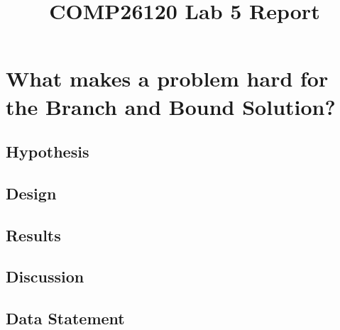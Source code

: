 \documentclass[a4]{article}
\title{COMP26120 Lab 5 Report}
\author{}
\begin{document}
\maketitle

\section{What makes a problem hard for the Branch and Bound Solution?}

\subsection{Hypothesis}
\subsection{Design}
\subsection{Results}
\subsection{Discussion}
\subsection{Data Statement}


\appendix

\end{document}
